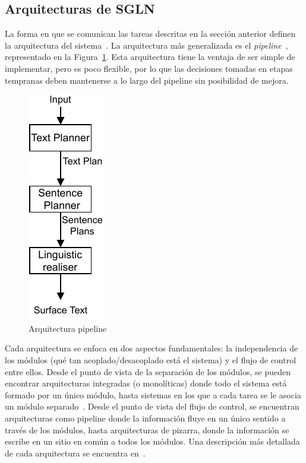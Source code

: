 \subsection{Arquitecturas de SGLN}
La forma en que se comunican las tareas descritas en la sección anterior definen la arquitectura del sistema~\cite{ibanez2004arquitectura}. La arquitectura más generalizada es el \emph{pipeline}~\cite{hervas2008descripcion}, representado en la Figura~\ref{fig:arq_pipeline}.
Esta arquitectura tiene la ventaja de ser simple de implementar, pero es poco flexible, por lo que las decisiones tomadas en etapas tempranas deben mantenerse a lo largo del pipeline sin posibilidad de mejora.

\begin{figure}
    \centering
    \includegraphics[]{img/antecedentes/pipeline.pdf}
    \caption{Arquitectura pipeline}
    \label{fig:arq_pipeline}
\end{figure}
 

Cada arquitectura se enfoca en dos aspectos fundamentales: la independencia de los módulos (qué tan acoplado/desacoplado está el sistema) y el flujo de control entre ellos. Desde el punto de vista de la separación de los módulos, se pueden encontrar arquitecturas integradas (o monolíticas) donde todo el sistema está formado por un único módulo, hasta sistemas en los que a cada tarea se le asocia un módulo separado~\cite{hervas2008descripcion}. Desde el punto de vista del flujo de control, se encuentran arquitecturas como pipeline donde la información fluye en un único sentido a través de los módulos, hasta arquitecturas de pizarra, donde la información se escribe en un sitio en común a todos los módulos.
Una descripción más detallada de cada arquitectura se encuentra  en~\cite{ibanez2004arquitectura}.

